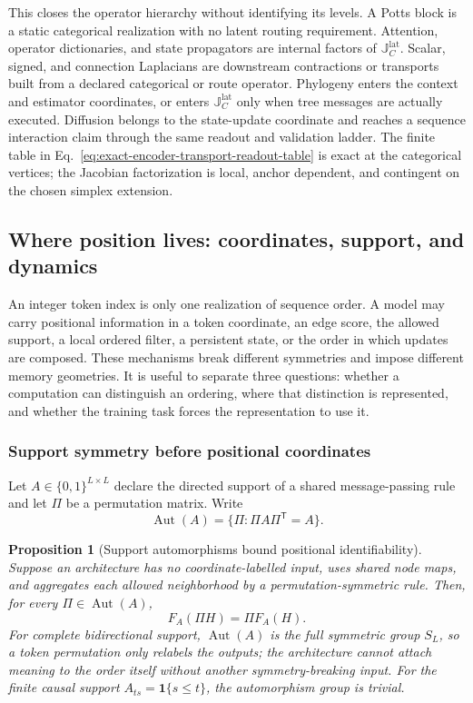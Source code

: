 \documentclass[10pt]{article}
\newtheorem{proposition}[theorem]{Proposition}
\theoremstyle{definition}
\theoremstyle{remark}
\newcommand{\BookSubsection}[1]{\subsubsection{#1}}
\newcommand{\BookSection}[1]{\subsection{#1}}
\begin{document}
This closes the operator hierarchy without identifying its levels.  A Potts block is a static
categorical realization with no latent routing requirement.  Attention, operator dictionaries, and
state propagators are internal factors of $\mathbb J_C^{\mathrm{lat}}$.  Scalar, signed, and
connection Laplacians are downstream contractions or transports built from a declared categorical
or route operator.  Phylogeny enters the context and estimator coordinates, or enters
$\mathbb J_C^{\mathrm{lat}}$ only when tree messages are actually executed.  Diffusion belongs to
the state-update coordinate and reaches a sequence interaction claim through the same readout and
validation ladder.  The finite table in Eq.~\ref{eq:exact-encoder-transport-readout-table} is exact
at the categorical vertices; the Jacobian factorization is local, anchor dependent, and contingent
on the chosen simplex extension.

\BookSection{Where position lives: coordinates, support, and dynamics}

An integer token index is only one realization of sequence order.  A model may carry positional
information in a token coordinate, an edge score, the allowed support, a local ordered filter, a
persistent state, or the order in which updates are composed.  These mechanisms break different
symmetries and impose different memory geometries.  It is useful to separate three questions:
whether a computation can distinguish an ordering, where that distinction is represented, and
whether the training task forces the representation to use it.

\BookSubsection{Support symmetry before positional coordinates}

Let $A\in\{0,1\}^{L\times L}$ declare the directed support of a shared message-passing rule and let
$\Pi$ be a permutation matrix.  Write
\begin{equation}
\operatorname{Aut}(A)
=\{\Pi:\Pi A\Pi^{\mathsf T}=A\}.
\label{eq:support-automorphism-group}
\end{equation}

\begin{proposition}[Support automorphisms bound positional identifiability]
\label{prop:support-position-identifiability}
Suppose an architecture has no coordinate-labelled input, uses shared node maps, and aggregates each
allowed neighborhood by a permutation-symmetric rule.  Then, for every
$\Pi\in\operatorname{Aut}(A)$,
\begin{equation}
F_A(\Pi H)=\Pi F_A(H).
\label{eq:support-automorphism-equivariance}
\end{equation}
For complete bidirectional support, $\operatorname{Aut}(A)$ is the full symmetric group $S_L$, so
a token permutation only relabels the outputs; the architecture cannot attach meaning to the order
itself without another symmetry-breaking input.
For the finite causal support $A_{ts}=\mathbf 1\{s\leq t\}$, the automorphism group is trivial.
\end{proposition}
\end{document}
